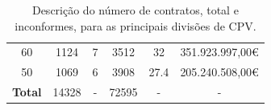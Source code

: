 \begin{table}[H]
{\begin{tabular}{cccccc}
		60                   & 1124                                                                                & 7           & 3512                                                                          & 32          & 351.923.997,00€                                                           \\
		50                   & 1069                                                                                & 6           & 3908                                                                          & 27.4        & 205.240.508,00€                                                           \\ \midrule
		\textbf{Total}       & 14328                                                                               & -           & 72595                                                                         & -           & -                                                                         \\ \hline
	\end{tabular}%
	}
	\caption{Descrição do número de contratos, total e inconformes, para as principais divisões de CPV.}
	\label{tab:rf18stats}
\end{table}







